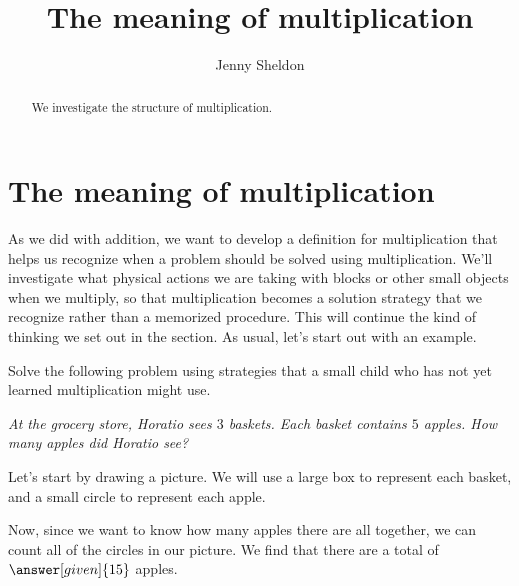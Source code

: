 \documentclass{ximera}
\title{The meaning of multiplication}
\author{Jenny Sheldon}
\begin{document}
\begin{abstract}
We investigate the structure of multiplication.
\end{abstract}
\maketitle


\section{The meaning of multiplication}

As we did with addition, we want to develop a definition for multiplication that helps us recognize when a problem should be solved using multiplication. We'll investigate what physical actions we are taking with blocks or other small objects when we multiply, so that multiplication becomes a solution strategy that we recognize rather than a memorized procedure. This will continue the kind of thinking we set out in the  section. As usual, let's start out with an example.

\begin{example}
Solve the following problem using  strategies that a small child who has not yet learned multiplication might use.

\emph{At the grocery store, Horatio sees $3$ baskets. Each basket contains $5$ apples. How many apples did Horatio see?}

\begin{explanation}
Let's start by drawing a picture. We will use a large box to represent each basket, and a small circle to represent each apple.

\begin{image}
\end{image}
Now, since we want to know how many apples there are all together, we can count all of the circles in our picture. We find that there are a total of $\answer[given]{15}$ apples.

\end{explanation}

\end{example}
\end{document}
